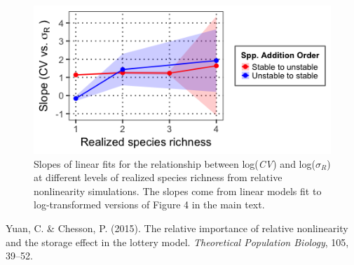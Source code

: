 \documentclass[11pt,]{article}
\begin{document}
\newpage{}

\begin{figure}[!ht]
  \centering
      \includegraphics[width=5in]{./components/relative_nonlinearity_div+envar_loglog_slopes.png}
  \caption{Slopes of linear fits for the relationship between log(\emph{CV}) and log($\sigma_R$) at different levels of realized species richness from relative nonlinearity simulations. The slopes come from linear models fit to log-transformed versions of Figure 4 in the main text.}
\end{figure}

\hypertarget{refs}{}
\hypertarget{ref-Yuan2015}{}
Yuan, C. \& Chesson, P. (2015). The relative importance of relative
nonlinearity and the storage effect in the lottery model.
\emph{Theoretical Population Biology}, 105, 39--52.
\end{document}
